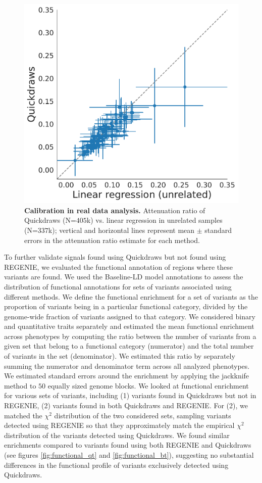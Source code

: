 \begin{figure}
    \centering
    \includegraphics[width=0.65\linewidth]{figures/qd_ukb/attnratio_plot.pdf}
    \caption{\textbf{Calibration in real data analysis.} Attenuation ratio of Quickdraws (N=$405$k) vs. linear regression in unrelated samples (N=$337$k); vertical and horizontal lines represent mean $\pm$ standard errors in the attenuation ratio estimate for each method.}
    \label{fig:real1c}
\end{figure}

%
To further validate signals found using Quickdraws but not found using REGENIE, we evaluated the functional annotation of regions where these variants are found.
%
We used the Baseline-LD model annotations \cite{finucane2015partitioning,gazal2017linkage} to assess the distribution of functional annotations for sets of variants associated using different methods.
%
We define the functional enrichment for a set of variants as the proportion of variants being in a particular functional category, divided by the genome-wide fraction of variants assigned to that category.
%
We considered binary and quantitative traits separately and estimated the mean functional enrichment across phenotypes by computing the ratio between the number of variants from a given set that belong to a functional category (numerator) and the total number of variants in the set (denominator).
%
We estimated this ratio by separately summing the numerator and denominator term across all analyzed phenotypes.
%
We estimated standard errors around the enrichment by applying the jackknife method to $50$ equally sized genome blocks.
%
We looked at functional enrichment for various sets of variants, including (1) variants found in Quickdraws but not in REGENIE, (2) variants found in both Quickdraws and REGENIE.
%
For (2), we matched the $\chi^2$ distribution of the two considered sets, sampling variants detected using REGENIE so that they approximately match the empirical $\chi^2$ distribution of the variants detected using Quickdraws.
%
We found similar enrichments compared to variants found using both REGENIE and Quickdraws (see figures \ref{fig:functional_qt} and \ref{fig:functional_bt}), suggesting no substantial differences in the functional profile of variants exclusively detected using Quickdraws.
%

